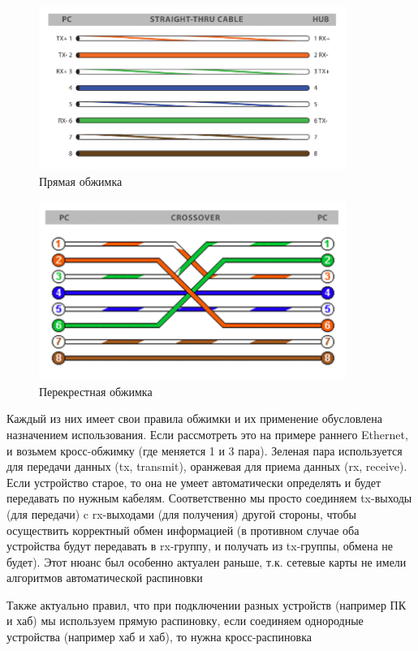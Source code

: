 \documentclass[a4paper]{article}
\begin{document}
\begin{figure}[!h]
	\centering
	\includegraphics[width=10cm]{21-straight-thru-cable}
	\caption{Прямая обжимка}
	\label{fig:pic-21-straight-thru-cable}
\end{figure}

\begin{figure}[!h]
	\centering
	\includegraphics[width=10cm]{22-crossover-cable}
	\caption{Перекрестная обжимка}
	\label{fig:pic-22-crossover-cable}
\end{figure}

Каждый из них имеет свои правила обжимки и их применение обусловлена назначением использования. Если рассмотреть это на примере раннего Ethernet, и возьмем кросс-обжимку (где меняется 1 и 3 пара). Зеленая пара используется для передачи данных (tx, transmit), оранжевая для приема данных (rx, receive). Если устройство старое, то она не умеет автоматически определять и будет передавать по нужным кабелям. Соответственно мы просто соединяем tx-выходы (для передачи) c rx-выходами (для получения) другой стороны, чтобы осуществить корректный обмен информацией (в противном случае оба устройства будут передавать в rx-группу, и получать из tx-группы, обмена не будет). Этот нюанс был особенно актуален раньше, т.к. сетевые карты не имели алгоритмов автоматической распиновки

Также актуально правил, что при подключении разных устройств (например ПК и хаб) мы используем прямую распиновку, если соединяем однородные устройства (например хаб и хаб), то нужна кросс-распиновка
\end{document}
